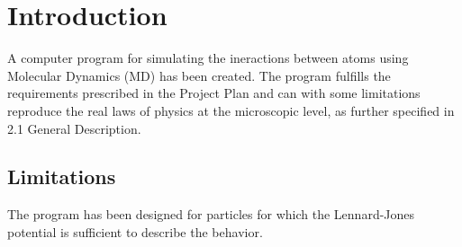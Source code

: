 \section{Introduction}
A computer program for simulating the ineractions between atoms using Molecular Dynamics (MD) has been created. The program fulfills the requirements prescribed in the Project Plan and can with some limitations reproduce the real laws of physics at the microscopic level, as further specified in 2.1 General Description.
\subsection{Limitations}
The program has been designed for particles for which the Lennard-Jones potential is sufficient to describe the behavior.
